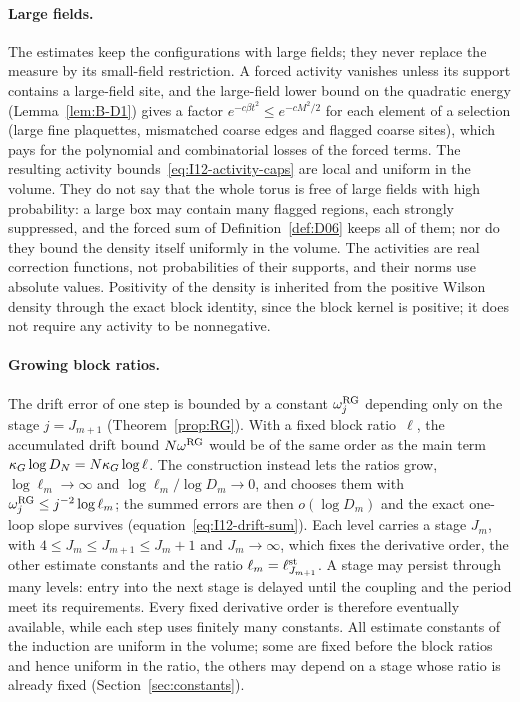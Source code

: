 \paragraph{Large fields.}
The estimates keep the configurations with large fields; they never replace the measure by its small-field restriction. A forced activity vanishes unless its support contains a large-field site, and the large-field lower bound on the quadratic energy (Lemma~\ref{lem:B-D1}) gives a factor $e^{-c\beta t^2}\le e^{-cM^2/2}$ for each element of a selection (large fine plaquettes, mismatched coarse edges and flagged coarse sites), which pays for the polynomial and combinatorial losses of the forced terms. The resulting activity bounds~\eqref{eq:I12-activity-caps} are local and uniform in the volume. They do not say that the whole torus is free of large fields with high probability: a large box may contain many flagged regions, each strongly suppressed, and the forced sum of Definition~\ref{def:D06} keeps all of them; nor do they bound the density itself uniformly in the volume. The activities are real correction functions, not probabilities of their supports, and their norms use absolute values. Positivity of the density is inherited from the positive Wilson density through the exact block identity, since the block kernel is positive; it does not require any activity to be nonnegative.

\paragraph{Growing block ratios.}
The drift error of one step is bounded by a constant $\omega^{\rm RG}_j$ depending only on the stage $j=J_{m+1}$ (Theorem~\ref{prop:RG}). With a fixed block ratio~$\ell$, the accumulated drift bound $N\omega^{\rm RG}$ would be of the same order as the main term $\kappa_G\log D_N=N\kappa_G\log\ell$. The construction instead lets the ratios grow, $\log\ell_m\to\infty$ and $\log\ell_m/\log D_m\to0$, and chooses them with $\omega^{\rm RG}_j\le j^{-2}\log\ell_m$; the summed errors are then $o(\log D_m)$ and the exact one-loop slope survives (equation~\eqref{eq:I12-drift-sum}). Each level carries a stage $J_m$, with $4\le J_m\le J_{m+1}\le J_m+1$ and $J_m\to\infty$, which fixes the derivative order, the other estimate constants and the ratio $\ell_m=\ell^{\rm st}_{J_{m+1}}$. A stage may persist through many levels: entry into the next stage is delayed until the coupling and the period meet its requirements. Every fixed derivative order is therefore eventually available, while each step uses finitely many constants. All estimate constants of the induction are uniform in the volume; some are fixed before the block ratios and hence uniform in the ratio, the others may depend on a stage whose ratio is already fixed (Section~\ref{sec:constants}).

